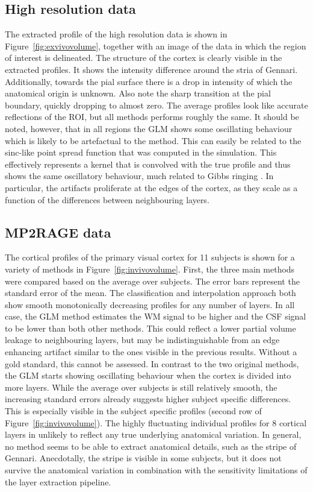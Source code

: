 \subsection{High resolution data}
The extracted profile of the high resolution data is shown in Figure~\ref{fig:exvivovolume}, together with an image of the data in which the region of interest is delineated. The structure of the cortex is clearly visible in the extracted profiles. It shows the intensity difference around the stria of Gennari. Additionally, towards the pial surface there is a drop in intensity of which the anatomical origin is unknown. Also note the sharp transition at the pial boundary, quickly dropping to almost zero. The average profiles look like accurate reflections of the ROI, but all methods performs roughly the same. It should be noted, however, that in all regions the GLM shows some oscillating behaviour which is likely to be artefactual to the method. This can easily be related to the sinc-like point spread function that was computed in the simulation. This effectively represents a kernel that is convolved with the true profile and thus shows the same oscillatory behaviour, much related to Gibbs ringing \cite{Gibbs1898}. In particular, the artifacts proliferate at the edges of the cortex, as they scale as a function of the differences between neighbouring layers.


\subsection{MP2RAGE data}
The cortical profiles of the primary visual cortex for 11 subjects is shown for a variety of methods in Figure~\ref{fig:invivovolume}. First, the three main methods were compared based on the average over subjects. The error bars represent the standard error of the mean. The classification and interpolation approach both show smooth monotonically decreasing profiles for any number of layers. In all case, the GLM method estimates the WM signal to be higher and the CSF signal to be lower than both other methods. This could reflect a lower partial volume leakage to neighbouring layers, but may be indistinguishable from an edge enhancing artifact similar to the ones visible in the previous results. Without a gold standard, this cannot be assessed. In contrast to the two original methods, the GLM starts showing oscillating behaviour when the cortex is divided into more layers. While the average over subjects is still relatively smooth, the increasing standard errors already suggests higher subject specific differences. This is especially visible in the subject specific profiles (second row of Figure~\ref{fig:invivovolume}). The highly fluctuating individual profiles for 8 cortical layers in unlikely to reflect any true underlying anatomical variation. In general, no method seems to be able to extract anatomical details, such as the stripe of Gennari. Anecdotally, the stripe is visible in some subjects, but it does not survive the anatomical variation in combination with the sensitivity limitations of the layer extraction pipeline.

